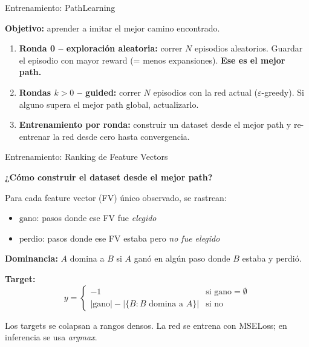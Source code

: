 \documentclass{beamer}
\begin{document}
\begin{frame}{Entrenamiento: PathLearning}

\textbf{Objetivo:} aprender a imitar el mejor camino encontrado.

\bigskip
\begin{enumerate}
  \item \textbf{Ronda 0 -- exploración aleatoria:} correr $N$ episodios aleatorios. Guardar el episodio con mayor reward (= menos expansiones). \textbf{Ese es el mejor path.}

  \bigskip
  \item \textbf{Rondas $k > 0$ -- guided:} correr $N$ episodios con la red actual ($\varepsilon$-greedy). Si alguno supera el mejor path global, actualizarlo.

  \bigskip
  \item \textbf{Entrenamiento por ronda:} construir un dataset desde el mejor path y re-entrenar la red desde cero hasta convergencia.
\end{enumerate}

\end{frame}

\begin{frame}{Entrenamiento: Ranking de Feature Vectors}

\textbf{¿Cómo construir el dataset desde el mejor path?}

\bigskip
Para cada feature vector (FV) único observado, se rastrean:
\begin{itemize}
  \item $\text{gano}$: pasos donde ese FV fue \emph{elegido}
  \item $\text{perdio}$: pasos donde ese FV estaba pero \emph{no fue elegido}
\end{itemize}

\medskip
\textbf{Dominancia:} $A$ domina a $B$ si $A$ ganó en algún paso donde $B$ estaba y perdió.

\medskip
\textbf{Target:}
\[
  y = \begin{cases}
    -1 & \text{si } \text{gano} = \emptyset \\
    |\text{gano}| - |\{B : B \text{ domina a } A\}| & \text{si no}
  \end{cases}
\]

\medskip
Los targets se colapsan a rangos densos. La red se entrena con MSELoss; en inferencia se usa \emph{argmax}.

\end{frame}
\end{document}
